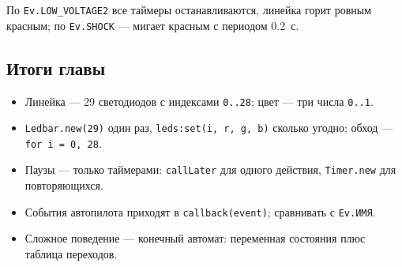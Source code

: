 \begin{taskbox}[Авария]
По \verb|Ev.LOW_VOLTAGE2| все таймеры останавливаются, линейка горит ровным красным; по \verb|Ev.SHOCK| --- мигает красным с периодом 0.2~с.
\end{taskbox}

\subsection*{Итоги главы}
\begin{itemize}
    \item Линейка --- 29 светодиодов с индексами \verb|0..28|; цвет --- три числа \verb|0..1|.
    \item \verb|Ledbar.new(29)| один раз, \verb|leds:set(i, r, g, b)| сколько угодно; обход --- \verb|for i = 0, 28|.
    \item Паузы --- только таймерами: \verb|callLater| для одного действия, \verb|Timer.new| для повторяющихся.
    \item События автопилота приходят в \verb|callback(event)|; сравнивать с \verb|Ev.ИМЯ|.
    \item Сложное поведение --- конечный автомат: переменная состояния плюс таблица переходов.
\end{itemize}
